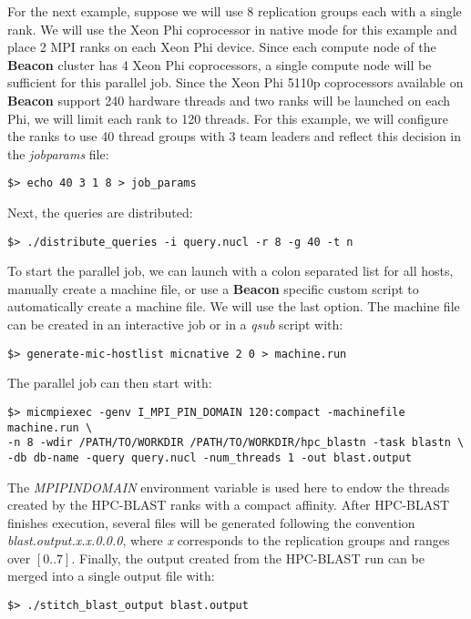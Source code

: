 \documentclass[10pt]{article}
\newcommand{\beac}{\textbf{Beacon }}
\begin{document}
For the next example, suppose we will use 8 replication groups each with a single rank.  We will use the Xeon Phi coprocessor in native mode for this example and place 2 MPI ranks on each Xeon Phi device.  Since each compute node of the
\beac cluster has 4 Xeon Phi coprocessors, a single compute node will be sufficient for this parallel job.  Since the Xeon Phi 5110p coprocessors available on \beac support
240 hardware threads and two ranks will be launched on each Phi, we will limit each rank to 120 threads.  For this example, we will configure the ranks to use 40 thread groups with 3 team leaders and reflect this decision in the \emph{job\textunderscore params} file:
\begin{verbatim}
$> echo 40 3 1 8 > job_params
\end{verbatim}
\noindent Next, the queries are distributed:
\begin{verbatim}
$> ./distribute_queries -i query.nucl -r 8 -g 40 -t n
\end{verbatim}
\noindent To start the parallel job, we can launch with a colon separated list for all hosts, manually create a machine file, or use a \beac specific custom script to automatically create a machine file.  We will use the last option.
The machine file can be created in an interactive job or in a \emph{qsub} script with:
\begin{verbatim}
$> generate-mic-hostlist micnative 2 0 > machine.run
\end{verbatim}
The parallel job can then start with:
\begin{verbatim}
$> micmpiexec -genv I_MPI_PIN_DOMAIN 120:compact -machinefile machine.run \
-n 8 -wdir /PATH/TO/WORKDIR /PATH/TO/WORKDIR/hpc_blastn -task blastn \
-db db-name -query query.nucl -num_threads 1 -out blast.output
\end{verbatim}
\noindent The \emph{MPI\textunderscore PIN\textunderscore DOMAIN} environment variable is used here to endow the threads created by the HPC-BLAST ranks with a compact affinity.
After HPC-BLAST finishes execution, several files will be generated following the convention \emph{blast.output.x.x.0.0.0}, where  \emph{x} corresponds to the replication groups and ranges over \([0..7]\). 
Finally, the output created from the HPC-BLAST run can be merged into a single output file with:
\begin{verbatim}
$> ./stitch_blast_output blast.output
\end{verbatim}
\end{document}
